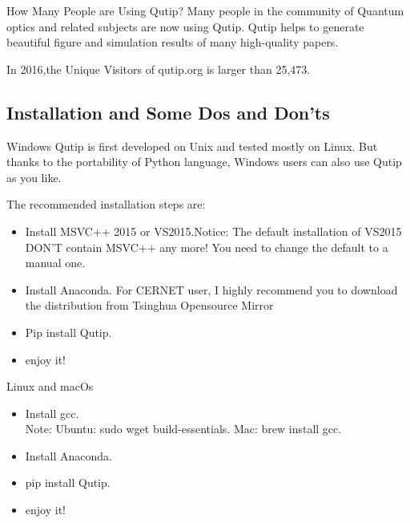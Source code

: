 \documentclass{beamer}
\begin{document}
\begin{frame}{How Many People are Using Qutip?}
Many people in the community of Quantum optics and related subjects are now using Qutip. Qutip helps to generate beautiful figure and simulation results of many high-quality papers.

In 2016,the Unique Visitors of qutip.org is larger than 25,473.
\end{frame}

\subsection{Installation and Some Dos and Don'ts}
\begin{frame}{Windows}
Qutip is first developed on Unix and tested mostly on Linux. But thanks to the portability of Python language, Windows users can also use Qutip as you like.

The recommended installation steps are:

\begin{itemize}
	\item Install MSVC++ 2015 or VS2015.Notice: The default installation of VS2015 DON'T contain MSVC++ any more! You need to change the default to a manual one.
	\item Install Anaconda. For CERNET user, I highly recommend you to download the distribution from Tsinghua Opensource Mirror
	\item Pip install Qutip.
	\item enjoy it!
\end{itemize}

\end{frame}

\begin{frame}{Linux and macOs}
\begin{itemize}
	\item Install gcc.\\Note: Ubuntu: sudo wget build-essentials. Mac: brew install gcc.
	\item Install Anaconda.
	\item pip install Qutip.
	\item enjoy it!
\end{itemize}
	
\end{frame}
\end{document}
